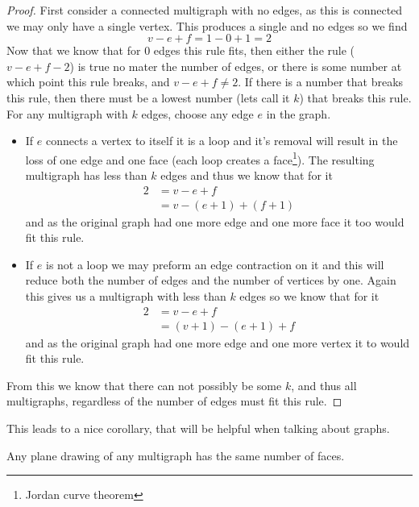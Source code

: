 \documentclass{article}
\begin{document}


\begin{proof}
	First consider a connected multigraph with no edges, as this is connected we may only have a single vertex. This produces a single and no edges so we find $$v-e+f=1-0+1=2$$ Now that we know that for 0 edges this rule fits, then either the rule ($v-e+f-2$) is true no mater the number of edges, or there is some number at which point this rule breaks, and $v-e+f\not=2$. If there is a number that breaks this rule, then there must be a lowest number (lets call it $k$) that breaks this rule. For any multigraph with $k$ edges, choose any edge $e$ in the graph.
	\begin{itemize}
		\item If $e$ connects a vertex to itself it is a loop and it's removal will result in the loss of one edge and one face (each loop creates a face\footnote{Jordan curve theorem}). The resulting multigraph has less than $k$ edges and thus we know that for it \begin{align*}2&=v-e+f \\&= v-(e+1)+(f+1)\end{align*} and as the original graph had one more edge and one more face it too would fit this rule.
		\item If $e$ is not a loop we may preform an edge contraction on it and this will reduce both the number of edges and the number of vertices by one. Again this gives us a multigraph with less than $k$ edges so we know that for it \begin{align*}2&=v-e+f\\&=(v+1)-(e+1)+f\end{align*} and as the original graph had one more edge and one more vertex it to would fit this rule.
	\end{itemize}
	
	From this we know that there can not possibly be some $k$, and thus all multigraphs, regardless of the number of edges must fit this rule.
\end{proof}
This leads to a nice corollary, that will be helpful when talking about graphs.
\begin{corallary}
	Any plane drawing of any multigraph has the same number of faces.
\end{corallary}
\end{document}
